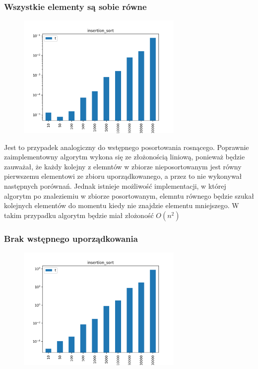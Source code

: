\documentclass[]{article}
\begin{document}
		\subsubsection{Wszystkie elementy są sobie równe}
			\begin{figure}[H]
				\centering
				\includegraphics[width=8cm]{insertion_sort_c.png}	
			\end{figure}
			Jest to przypadek analogiczny do wstępnego posortowania rosnącego. Poprawnie zaimplementowny algorytm wykona się ze złożonością liniową, ponieważ będzie zauważał, że każdy kolejny z elemntów w zbiorze nieposortowanym jest równy pierwszemu elementowi ze zbioru uporządkowanego, a przez to nie wykonywał następnych porównań. Jednak istnieje możliwość implementacji, w której algorytm po znaleziemiu w zbiorze posortowanym, elemntu równego będzie szukał kolejnych elementów do momentu kiedy nie znajdzie elementu mniejszego. W takim przypadku algorytm będzie miał złożoność $ O(n^2) $
		\subsubsection{Brak wstępnego uporządkowania}
			\begin{figure}[H]
				\centering
				\includegraphics[width=8cm]{insertion_sort_r.png}	
			\end{figure}
		
\end{document}
